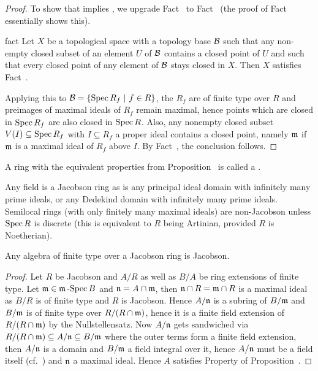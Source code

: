 \documentclass[a4paper,parskip=half,numbers=enddot, DIV=12]{scrreprt}
\begin{document}
\begin{proof}
    To show that  implies , we upgrade Fact~ to Fact~ (the proof of Fact~ essentially shows this).
    
    \begin{varthm}[$^{++}$]{fact}
        Let $X$ be a topological space with a topology base $\mathcal{B}$ such that any non-empty closed subset of an element $U$ of $\mathcal{B}$ contains a closed point of $U$ and such that every closed point of any  element of $\mathcal{B}$ stays closed in $X$. Then $X$ satisfies Fact~.
    \end{varthm}
    
    Applying this to $\mathcal{B} = \left\{\operatorname{Spec} R_f \ \middle|\  f\in R\right\}$, the $R_f$ are of finite type over $R$ and preimages of maximal ideals of $R_f$ remain maximal, hence points which are closed in $\operatorname{Spec} R_f$ are also closed in $\operatorname{Spec} R$. Also, any nonempty closed subset $V(I)\subseteq \operatorname{Spec} R_f$ with $I\subseteq R_f$ a proper ideal contains a closed point, namely $\mathfrak{m}$ if $\mathfrak{m}$ is a maximal ideal of $R_f$ above $I$. By Fact~, the conclusion follows. 
\end{proof}
\begin{defi}
    A ring with the equivalent properties from Proposition~ is called a .
\end{defi}
\begin{example}
    Any field is a Jacobson ring as is any principal ideal domain with infinitely many prime ideals, or any Dedekind domain with infinitely many prime ideals. Semilocal rings (with only finitely many maximal ideals) are non-Jacobson unless $\operatorname{Spec} R$ is discrete (this is equivalent to $R$ being Artinian, provided $R$ is Noetherian).
\end{example}
\begin{cor}
    Any algebra of finite type over a Jacobson ring is Jacobson.
\end{cor}
\begin{proof}
    Let $R$ be Jacobson and $A/R$ as well as $B/A$ be ring extensions of finite type. Let $\mathfrak{m}\in \mathfrak{m}\operatorname{-Spec} B$ and $\mathfrak{n} = A\cap \mathfrak{m}$, then $\mathfrak{n}\cap R = \mathfrak{m}\cap R$ is a maximal ideal as $B/R$ is of finite type and $R$ is Jacobson. Hence $A/\mathfrak{n}$ is a subring of $B/\mathfrak{m}$ and $B/\mathfrak{m}$ is of finite type over $R/(R\cap\mathfrak{m})$, hence it is a finite field extension of $R/(R\cap\mathfrak{m})$ by the Nullstellensatz. Now $A/\mathfrak{n}$ gets sandwiched via $R/(R\cap\mathfrak{m}) \subseteq A/\mathfrak{n} \subseteq B/\mathfrak{m}$ where the outer terms form a finite field extension, then $A/\mathfrak{n}$ is a domain and $B/\mathfrak{m}$ a field integral over it, hence $A/\mathfrak{n}$ must be a field itself (cf.\ \cite[Proposition~1.5.1]{alg1}) and $\mathfrak{n}$ a maximal ideal. Hence $A$ satisfies Property  of Proposition~.
\end{proof}
\end{document}
